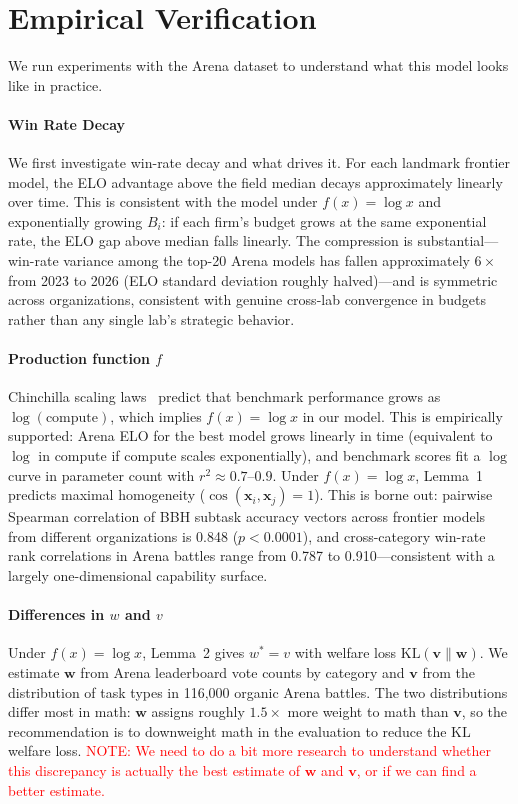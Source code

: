 \documentclass[msom,blindrev]{informs3_ExtAbst}
\newcommand{\NS}[1]{\textcolor{red}{#1}}
\begin{document}
\section{Empirical Verification}
We run experiments with the Arena dataset to understand what this model looks like in practice.

\paragraph{Win Rate Decay}
We first investigate win-rate decay and what drives it.
For each landmark frontier model, the ELO advantage above the field median decays approximately linearly over time.
This is consistent with the model under $f(x) = \log x$ and exponentially growing $B_i$: if each firm's budget grows at the same exponential rate, the ELO gap above median falls linearly.
The compression is substantial---win-rate variance among the top-20 Arena models has fallen approximately $6\times$ from 2023 to 2026 (ELO standard deviation roughly halved)---and is symmetric across organizations, consistent with genuine cross-lab convergence in budgets rather than any single lab's strategic behavior.

\paragraph{Production function $f$}
Chinchilla scaling laws~\citep{chinchilla} predict that benchmark performance grows as $\log(\text{compute})$, which implies $f(x) = \log x$ in our model.
This is empirically supported: Arena ELO for the best model grows linearly in time (equivalent to $\log$ in compute if compute scales exponentially), and benchmark scores fit a $\log$ curve in parameter count with $r^2 \approx 0.7$--$0.9$.
Under $f(x) = \log x$, Lemma~1 predicts maximal homogeneity ($\cos(\mathbf{x}_i, \mathbf{x}_j) = 1$).
This is borne out: pairwise Spearman correlation of BBH subtask accuracy vectors across frontier models from different organizations is 0.848 ($p < 0.0001$), and cross-category win-rate rank correlations in Arena battles range from 0.787 to 0.910---consistent with a largely one-dimensional capability surface.

\paragraph{Differences in $w$ and $v$}
Under $f(x) = \log x$, Lemma~2 gives $w^{*} = v$ with welfare loss $\mathrm{KL}(\mathbf{v} \| \mathbf{w})$.
We estimate $\mathbf{w}$ from Arena leaderboard vote counts by category and $\mathbf{v}$ from the distribution of task types in 116,000 organic Arena battles.
The two distributions differ most in math: $\mathbf{w}$ assigns roughly $1.5\times$ more weight to math than $\mathbf{v}$, so the recommendation is to downweight math in the evaluation to reduce the $\mathrm{KL}$ welfare loss.
\NS{NOTE: We need to do a bit more research to understand whether this discrepancy is actually the best estimate of $\mathbf{w}$ and $\mathbf{v}$, or if we can find a better estimate.} 
\end{document}
